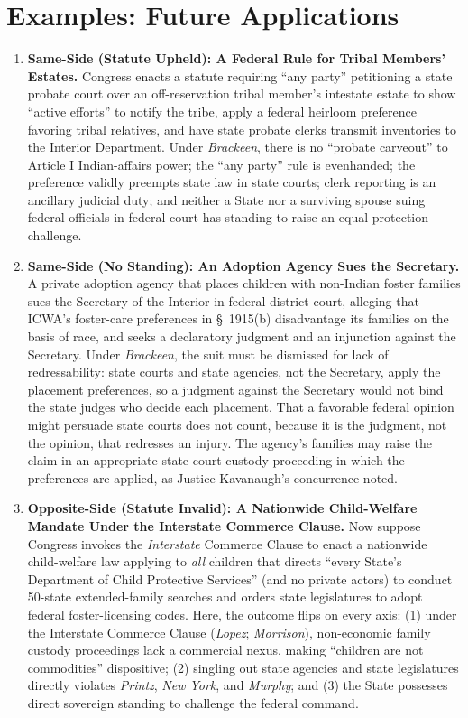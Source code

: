\documentclass[12pt]{article}
\begin{document}
\section{Examples: Future Applications}
\begin{enumerate}

\item \textbf{Same-Side (Statute Upheld): A Federal Rule for Tribal Members' Estates.} Congress enacts a statute requiring ``any party'' petitioning a state probate court over an off-reservation tribal member's intestate estate to show ``active efforts'' to notify the tribe, apply a federal heirloom preference favoring tribal relatives, and have state probate clerks transmit inventories to the Interior Department. Under \textit{Brackeen}, there is no ``probate carveout'' to Article I Indian-affairs power; the ``any party'' rule is evenhanded; the preference validly preempts state law in state courts; clerk reporting is an ancillary judicial duty; and neither a State nor a surviving spouse suing federal officials in federal court has standing to raise an equal protection challenge.

\item \textbf{Same-Side (No Standing): An Adoption Agency Sues the Secretary.} A private adoption agency that places children with non-Indian foster families sues the Secretary of the Interior in federal district court, alleging that ICWA's foster-care preferences in \S~1915(b) disadvantage its families on the basis of race, and seeks a declaratory judgment and an injunction against the Secretary. Under \textit{Brackeen}, the suit must be dismissed for lack of redressability: state courts and state agencies, not the Secretary, apply the placement preferences, so a judgment against the Secretary would not bind the state judges who decide each placement. That a favorable federal opinion might persuade state courts does not count, because it is the judgment, not the opinion, that redresses an injury. The agency's families may raise the claim in an appropriate state-court custody proceeding in which the preferences are applied, as Justice Kavanaugh's concurrence noted.

\item \textbf{Opposite-Side (Statute Invalid): A Nationwide Child-Welfare Mandate Under the Interstate Commerce Clause.} Now suppose Congress invokes the \emph{Interstate} Commerce Clause to enact a nationwide child-welfare law applying to \emph{all} children that directs ``every State's Department of Child Protective Services'' (and no private actors) to conduct 50-state extended-family searches and orders state legislatures to adopt federal foster-licensing codes. Here, the outcome flips on every axis: (1) under the Interstate Commerce Clause (\textit{Lopez}; \textit{Morrison}), non-economic family custody proceedings lack a commercial nexus, making ``children are not commodities'' dispositive; (2) singling out state agencies and state legislatures directly violates \textit{Printz}, \textit{New York}, and \textit{Murphy}; and (3) the State possesses direct sovereign standing to challenge the federal command.


\end{enumerate}
\end{document}
